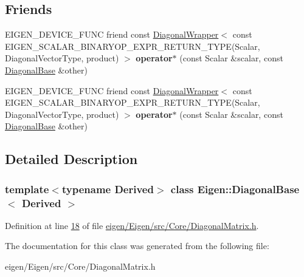 \subsection*{Friends}
\begin{DoxyCompactItemize}
\item 
\mbox{\label{class_eigen_1_1_diagonal_base_ada2d9c6b981ed18c3f45293e19211e47}} 
E\+I\+G\+E\+N\+\_\+\+D\+E\+V\+I\+C\+E\+\_\+\+F\+U\+NC friend const \hyperlink{group___core___module_class_eigen_1_1_diagonal_wrapper}{Diagonal\+Wrapper}$<$ const E\+I\+G\+E\+N\+\_\+\+S\+C\+A\+L\+A\+R\+\_\+\+B\+I\+N\+A\+R\+Y\+O\+P\+\_\+\+E\+X\+P\+R\+\_\+\+R\+E\+T\+U\+R\+N\+\_\+\+T\+Y\+PE(Scalar, Diagonal\+Vector\+Type, product) $>$ {\bfseries operator$\ast$} (const Scalar \&scalar, const \hyperlink{class_eigen_1_1_diagonal_base}{Diagonal\+Base} \&other)
\item 
\mbox{\label{class_eigen_1_1_diagonal_base_ada2d9c6b981ed18c3f45293e19211e47}} 
E\+I\+G\+E\+N\+\_\+\+D\+E\+V\+I\+C\+E\+\_\+\+F\+U\+NC friend const \hyperlink{group___core___module_class_eigen_1_1_diagonal_wrapper}{Diagonal\+Wrapper}$<$ const E\+I\+G\+E\+N\+\_\+\+S\+C\+A\+L\+A\+R\+\_\+\+B\+I\+N\+A\+R\+Y\+O\+P\+\_\+\+E\+X\+P\+R\+\_\+\+R\+E\+T\+U\+R\+N\+\_\+\+T\+Y\+PE(Scalar, Diagonal\+Vector\+Type, product) $>$ {\bfseries operator$\ast$} (const Scalar \&scalar, const \hyperlink{class_eigen_1_1_diagonal_base}{Diagonal\+Base} \&other)
\end{DoxyCompactItemize}


\subsection{Detailed Description}
\subsubsection*{template$<$typename Derived$>$\newline
class Eigen\+::\+Diagonal\+Base$<$ Derived $>$}



Definition at line \hyperlink{eigen_2_eigen_2src_2_core_2_diagonal_matrix_8h_source_l00018}{18} of file \hyperlink{eigen_2_eigen_2src_2_core_2_diagonal_matrix_8h_source}{eigen/\+Eigen/src/\+Core/\+Diagonal\+Matrix.\+h}.



The documentation for this class was generated from the following file\+:\begin{DoxyCompactItemize}
\item 
eigen/\+Eigen/src/\+Core/\+Diagonal\+Matrix.\+h\end{DoxyCompactItemize}
